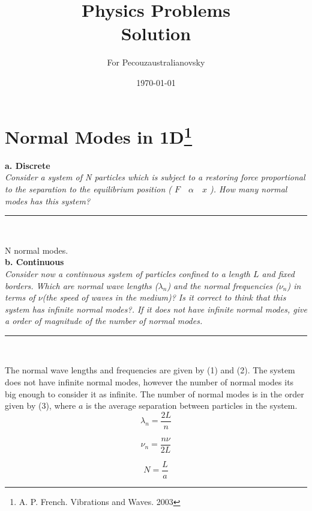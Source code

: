 \documentclass{article}
\begin{document}
\title{Physics Problems\\ Solution} %

\author{For Pecouzaustralianovsky} %

\date{\today}
\maketitle

\section*{Normal Modes in 1D\footnote{A. P. French. Vibrations and Waves. 2003}}

\textbf{a. Discrete}\\

\textit{Consider a system of N particles which is subject to a restoring force proportional to the separation to the equilibrium position ( $ F \quad \alpha \quad x $ ). How many normal modes has this system?}

\begin{center}
\noindent\rule{3cm}{0.4pt}\\
\end{center}

\vspace{2mm}

N normal modes.\\


\textbf{b. Continuous }\\

\textit{Consider now a continuous system of particles confined to a length $L$ and fixed borders. Which are normal wave lengths ($\lambda_n$) and the normal frequencies ($\nu_n$) in terms of $\nu$(the speed of waves in the medium)? Is it correct to think that this system has infinite normal modes?. If it does not have infinite normal modes, give a order of magnitude of the number of normal modes.}

\begin{center}
\noindent\rule{3cm}{0.4pt}\\
\end{center}

\vspace{2mm}

The normal wave lengths and frequencies are given by (1) and (2). The system does not have infinite normal modes, however the number of normal modes its big enough to consider it as infinite. The number of normal modes is in the order given by (3), where $a$ is the average separation between particles in the system. \\

\begin{equation}
\lambda_n = \frac{2L}{n}
\end{equation}

\begin{equation}
\nu_n = \frac{n \nu}{2L} 
\end{equation}

\begin{equation}
N = \frac{L}{a}
\end{equation}
\end{document}
